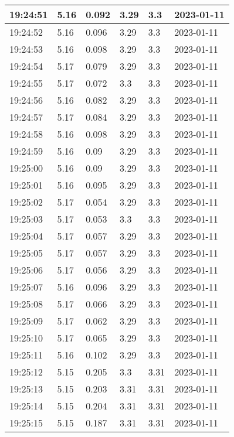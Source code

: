 \begin{longtable}{|l|l|l|l|l|l|}
        19:24:51 & 5.16 & 0.092 & 3.29 & 3.3 & 2023-01-11 \\ \hline
        19:24:52 & 5.16 & 0.096 & 3.29 & 3.3 & 2023-01-11 \\ \hline
        19:24:53 & 5.16 & 0.098 & 3.29 & 3.3 & 2023-01-11 \\ \hline
        19:24:54 & 5.17 & 0.079 & 3.29 & 3.3 & 2023-01-11 \\ \hline
        19:24:55 & 5.17 & 0.072 & 3.3 & 3.3 & 2023-01-11 \\ \hline
        19:24:56 & 5.16 & 0.082 & 3.29 & 3.3 & 2023-01-11 \\ \hline
        19:24:57 & 5.17 & 0.084 & 3.29 & 3.3 & 2023-01-11 \\ \hline
        19:24:58 & 5.16 & 0.098 & 3.29 & 3.3 & 2023-01-11 \\ \hline
        19:24:59 & 5.16 & 0.09 & 3.29 & 3.3 & 2023-01-11 \\ \hline
        19:25:00 & 5.16 & 0.09 & 3.29 & 3.3 & 2023-01-11 \\ \hline
        19:25:01 & 5.16 & 0.095 & 3.29 & 3.3 & 2023-01-11 \\ \hline
        19:25:02 & 5.17 & 0.054 & 3.29 & 3.3 & 2023-01-11 \\ \hline
        19:25:03 & 5.17 & 0.053 & 3.3 & 3.3 & 2023-01-11 \\ \hline
        19:25:04 & 5.17 & 0.057 & 3.29 & 3.3 & 2023-01-11 \\ \hline
        19:25:05 & 5.17 & 0.057 & 3.29 & 3.3 & 2023-01-11 \\ \hline
        19:25:06 & 5.17 & 0.056 & 3.29 & 3.3 & 2023-01-11 \\ \hline
        19:25:07 & 5.16 & 0.096 & 3.29 & 3.3 & 2023-01-11 \\ \hline
        19:25:08 & 5.17 & 0.066 & 3.29 & 3.3 & 2023-01-11 \\ \hline
        19:25:09 & 5.17 & 0.062 & 3.29 & 3.3 & 2023-01-11 \\ \hline
        19:25:10 & 5.17 & 0.065 & 3.29 & 3.3 & 2023-01-11 \\ \hline
        19:25:11 & 5.16 & 0.102 & 3.29 & 3.3 & 2023-01-11 \\ \hline
        19:25:12 & 5.15 & 0.205 & 3.3 & 3.31 & 2023-01-11 \\ \hline
        19:25:13 & 5.15 & 0.203 & 3.31 & 3.31 & 2023-01-11 \\ \hline
        19:25:14 & 5.15 & 0.204 & 3.31 & 3.31 & 2023-01-11 \\ \hline
        19:25:15 & 5.15 & 0.187 & 3.31 & 3.31 & 2023-01-11 \\ \hline

\end{longtable}
